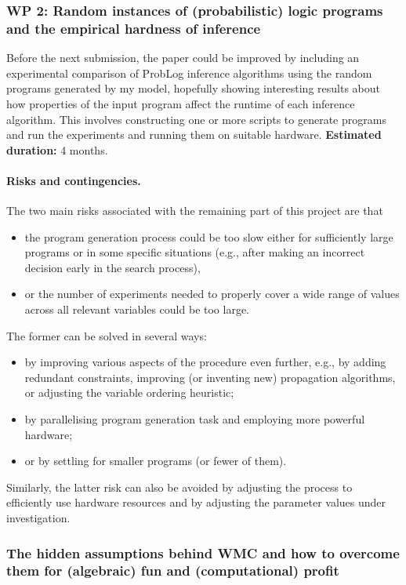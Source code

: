 \documentclass{article}
\begin{document}
\subsubsection{WP 2: Random instances of (probabilistic) logic programs and the
  empirical hardness of inference}

Before the next submission, the paper could be improved by including an
experimental comparison of ProbLog inference algorithms using the random
programs generated by my model, hopefully showing interesting results about how
properties of the input program affect the runtime of each inference algorithm.
This involves constructing one or more scripts to generate programs and run the
experiments and running them on suitable hardware. {\bf Estimated duration:} 4
months.

\paragraph{Risks and contingencies.} The two main risks associated with the
remaining part of this project are that
\begin{itemize}
\item the program generation process could be too slow either for sufficiently
  large programs or in some specific situations (e.g., after making an incorrect
  decision early in the search process),
\item or the number of experiments needed to properly cover a wide range of
  values across all relevant variables could be too large.
\end{itemize}
The former can be solved in several ways:
\begin{itemize}
\item by improving various aspects of the procedure even further, e.g., by
  adding redundant constraints, improving (or inventing new) propagation
  algorithms, or adjusting the variable ordering heuristic;
\item by parallelising program generation task and employing more powerful
  hardware;
\item or by settling for smaller programs (or fewer of them).
\end{itemize}
Similarly, the latter risk can also be avoided by adjusting the process to
efficiently use hardware resources and by adjusting the parameter values under
investigation.

\subsubsection{The hidden assumptions behind WMC and how to overcome them for
  (algebraic) fun and (computational) profit}
\end{document}
